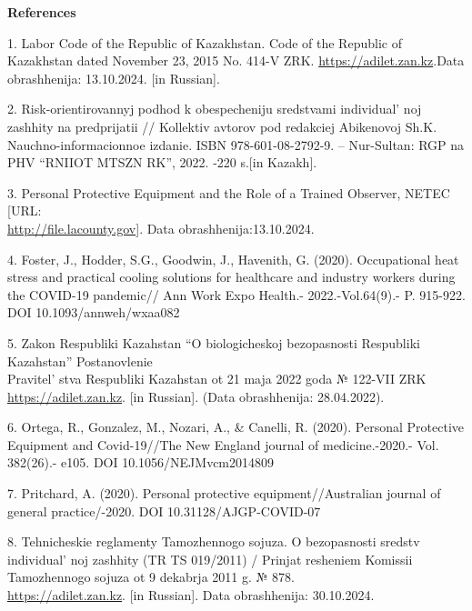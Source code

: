 \begin{center}
{\bfseries References}
\end{center}

\begin{references}
1. Labor Code of the Republic of Kazakhstan. Code of the Republic of
Kazakhstan dated November 23, 2015 No. 414-V ZRK.
\href{https://adilet.zan.kz/rus/docs/K1500000414}{https://adilet.zan.kz}.Data obrashhenija:
13.10.2024. {[}in Russian{]}.

2. Risk-orientirovannyj podhod k obespecheniju sredstvami
individual' noj zashhity na predprijatii // Kollektiv
avtorov pod redakciej Abikenovoj Sh.K. Nauchno-informacionnoe izdanie.
ISBN 978-601-08-2792-9. -- Nur-Sultan: RGP na PHV ``RNIIOT MTSZN RK'',
2022. -220 s.{[}in Kazakh{]}.

3. Personal Protective Equipment and the Role of a Trained Observer,
NETEC {[}URL:\\
\href{http://file.lacounty.gov/SDSInter/dhs/1068461_SlideDeck5-PPEandInfectionControlPrinciples.pdf}{http://file.lacounty.gov}{]}.
Data obrashhenija:13.10.2024.

4. Foster, J., Hodder, S.G., Goodwin, J., Havenith, G. (2020).
Occupational heat stress and practical cooling solutions for healthcare
and industry workers during the COVID-19 pandemic// Ann Work Expo
Health.- 2022.-Vol.64(9).- P. 915-922. DOI 10.1093/annweh/wxaa082

5. Zakon Respubliki Kazahstan ``O biologicheskoj bezopasnosti Respubliki
Kazahstan'' Postanovlenie \\Pravitel' stva Respubliki
Kazahstan ot 21 maja 2022 goda № 122-VII ZRK
\href{https://adilet.zan.kz/rus/docs/Z2200000122}{https://adilet.zan.kz}. {[}in Russian{]}. (Data
obrashhenija: 28.04.2022).

6. Ortega, R., Gonzalez, M., Nozari, A., \& Canelli, R. (2020). Personal
Protective Equipment and Covid-19//The New England journal of
medicine.-2020.- Vol. 382(26).- e105. DOI 10.1056/NEJMvcm2014809

7. Pritchard, A. (2020). Personal protective equipment//Australian
journal of general practice/-2020. DOI 10.31128/AJGP-COVID-07

8. Tehnicheskie reglamenty Tamozhennogo sojuza. O bezopasnosti sredstv
individual' noj zashhity (TR TS 019/2011) / Prinjat
resheniem Komissii Tamozhennogo sojuza ot 9 dekabrja 2011 g. № 878.\\
\href{https://adilet.zan.kz/rus/docs/H11T0000878}{https://adilet.zan.kz}. {[}in Russian{]}. Data
obrashhenija: 30.10.2024.


\end{references}
